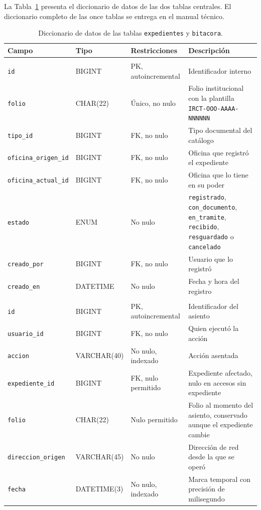 La Tabla~\ref{tab:diccionario} presenta el diccionario de datos de las dos tablas centrales. El diccionario completo de las once tablas se entrega en el manual técnico.

\begin{table}[H]
  \centering
  \small
  \renewcommand{\arraystretch}{1.25}
  \caption{Diccionario de datos de las tablas \texttt{expedientes} y \texttt{bitacora}.}
  \label{tab:diccionario}
  \begin{tabularx}{\textwidth}{@{}>{\raggedright\arraybackslash}p{3.6cm}>{\raggedright\arraybackslash}p{2.3cm}>{\raggedright\arraybackslash}p{2.5cm}>{\raggedright\arraybackslash}X@{}}
    \toprule
    \textbf{Campo} & \textbf{Tipo} & \textbf{Restricciones} & \textbf{Descripción} \\
    \midrule
    \multicolumn{4}{@{}l}{\textit{Tabla} \texttt{expedientes}} \\
    \addlinespace[2pt]
    \texttt{id} & BIGINT & PK, autoincremental & Identificador interno \\
    \texttt{folio} & CHAR(22) & Único, no nulo & Folio institucional con la plantilla \texttt{IRCT-OOO-AAAA-NNNNNN} \\
    \texttt{tipo\_id} & BIGINT & FK, no nulo & Tipo documental del catálogo \\
    \texttt{oficina\_origen\_id} & BIGINT & FK, no nulo & Oficina que registró el expediente \\
    \texttt{oficina\_actual\_id} & BIGINT & FK, no nulo & Oficina que lo tiene en su poder \\
    \texttt{estado} & ENUM & No nulo & \texttt{registrado}, \texttt{con\_documento}, \texttt{en\_tramite}, \texttt{recibido}, \texttt{resguardado} o \texttt{cancelado} \\
    \texttt{creado\_por} & BIGINT & FK, no nulo & Usuario que lo registró \\
    \texttt{creado\_en} & DATETIME & No nulo & Fecha y hora del registro \\
    \addlinespace[4pt]
    \multicolumn{4}{@{}l}{\textit{Tabla} \texttt{bitacora}} \\
    \addlinespace[2pt]
    \texttt{id} & BIGINT & PK, autoincremental & Identificador del asiento \\
    \texttt{usuario\_id} & BIGINT & FK, no nulo & Quien ejecutó la acción \\
    \texttt{accion} & VARCHAR(40) & No nulo, indexado & Acción asentada \\
    \texttt{expediente\_id} & BIGINT & FK, nulo permitido & Expediente afectado, nulo en accesos sin expediente \\
    \texttt{folio} & CHAR(22) & Nulo permitido & Folio al momento del asiento, conservado aunque el expediente cambie \\
    \texttt{direccion\_origen} & VARCHAR(45) & No nulo & Dirección de red desde la que se operó \\
    \texttt{fecha} & DATETIME(3) & No nulo, indexado & Marca temporal con precisión de milisegundo \\
    \bottomrule
  \end{tabularx}
\end{table}

